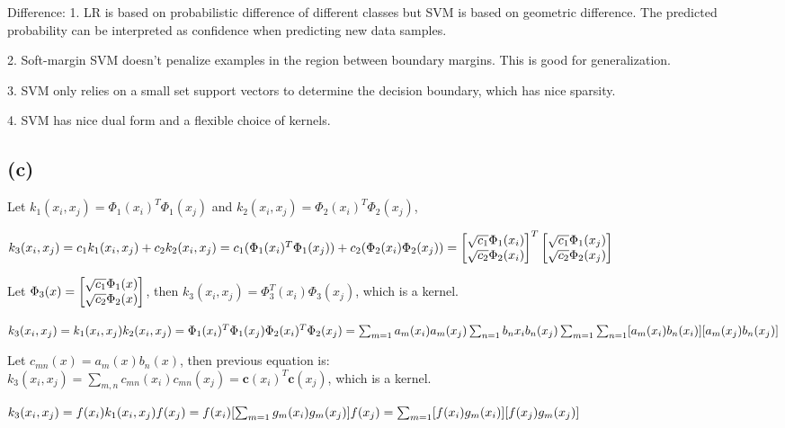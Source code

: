 \documentclass[]{article}
\begin{document}
Difference: 
1. LR is based on probabilistic difference of different classes but SVM is based on geometric difference. The predicted probability can be interpreted as confidence when predicting new data samples. 

2. Soft-margin SVM doesn't penalize examples in the region between boundary margins. This is good for generalization. 

3. SVM only relies on a small set support vectors to determine the decision boundary, which has nice sparsity. 

4. SVM has nice dual form and a flexible choice of kernels.

\subsection*{(c)}
Let $k_1(x_i,x_j)=\Phi_1(x_i)^T\Phi_1(x_j)$ and $k_2(x_i,x_j)=\Phi_2(x_i)^T\Phi_2(x_j)$,

$k_3(x_i,x_j)=c_1k_1(x_i,x_j)+c_2k_2(x_i, x_j)=c_1(\Phi_1(x_i)^T\Phi_1(x_j))+c_2(\Phi_2(x_i)\Phi_2(x_j))\\
=\newmat{\sqrt{c_1}\Phi_1(x_i)\\\sqrt{c_2}\Phi_2(x_i)}^T \newmat{\sqrt{c_1}\Phi_1(x_j)\\\sqrt{c_2}\Phi_2(x_j)}$

Let $\Phi_3(x)=\newmat{\sqrt{c_1}\Phi_1(x)\\\sqrt{c_2}\Phi_2(x)}$, then $k_3(x_i,x_j)=\Phi_3^T(x_i)\Phi_3(x_j)$, which is a kernel. 

\vspace{1cm}
$k_3(x_i,x_j)=k_1(x_i,x_j)k_2(x_i,x_j)=\Phi_1(x_i)^T\Phi_1(x_j)\Phi_2(x_i)^T\Phi_2(x_j)\\
=\sum_{m=1} a_m(x_i)a_m(x_j)\sum_{n=1}b_n{x_i}b_n(x_j)\\
\sum_{m=1}\sum_{n=1}[a_m(x_i)b_n(x_i)][a_m(x_j)b_n(x_j)]$

Let $c_{mn}(x)=a_m(x)b_n(x)$, then previous equation is:\\
$k_3(x_i,x_j)=\sum_{m,n}c_{mn}(x_i)c_{mn}(x_j)=\mathbf{c}(x_i)^T\mathbf{c}(x_j)$, which is a kernel. 

\vspace{1cm}
$k_3(x_i,x_j)=f(x_i)k_1(x_i,x_j)f(x_j)\\
=f(x_i)[\sum_{m=1}g_m(x_i)g_m(x_j)]f(x_j)\\
=\sum_{m=1}[f(x_i)g_m(x_i)][f(x_j)g_m(x_j)]$
\end{document}
